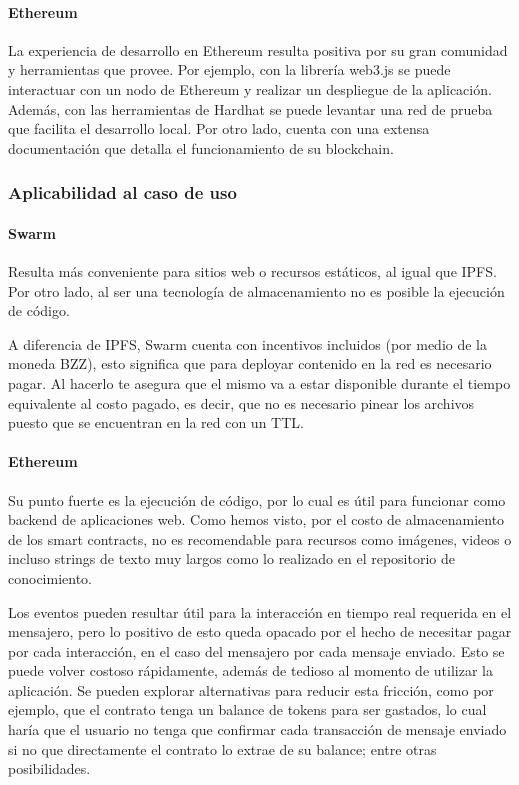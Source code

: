 \paragraph{Ethereum}
La experiencia de desarrollo en Ethereum resulta positiva por su gran comunidad y herramientas que provee. Por ejemplo, con la librería web3.js se puede interactuar con un nodo de Ethereum y realizar un despliegue de la aplicación. Además, con las herramientas de Hardhat se puede levantar una red de prueba que facilita el desarrollo local. Por otro lado, cuenta con una extensa documentación que detalla el funcionamiento de su blockchain.

\subsubsection{Aplicabilidad al caso de uso}

\paragraph{Swarm}
Resulta más conveniente para sitios web o recursos estáticos, al igual que IPFS. Por otro lado, al ser una tecnología de almacenamiento no es posible la ejecución de código.

A diferencia de IPFS, Swarm cuenta con incentivos incluidos (por medio de la moneda BZZ), esto significa que para deployar contenido en la red es necesario pagar. Al hacerlo te asegura que el mismo va a estar disponible durante el tiempo equivalente al costo pagado, es decir, que no es necesario pinear los archivos puesto que se encuentran en la red con un TTL.

\paragraph{Ethereum}
Su punto fuerte es la ejecución de código, por lo cual es útil para funcionar como backend de aplicaciones web. Como hemos visto, por el costo de almacenamiento de los smart contracts, no es recomendable para recursos como imágenes, videos o incluso strings de texto muy largos como lo realizado en el repositorio de conocimiento. 

Los eventos pueden resultar útil para la interacción en tiempo real requerida en el mensajero, pero lo positivo de esto queda opacado por el hecho de necesitar pagar por cada interacción, en el caso del mensajero por cada mensaje enviado. Esto se puede volver costoso rápidamente, además de tedioso al momento de utilizar la aplicación. Se pueden explorar alternativas para reducir esta fricción, como por ejemplo, que el contrato tenga un balance de tokens para ser gastados, lo cual haría que el usuario no tenga que confirmar cada transacción de mensaje enviado si no que directamente el contrato lo extrae de su balance; entre otras posibilidades.

